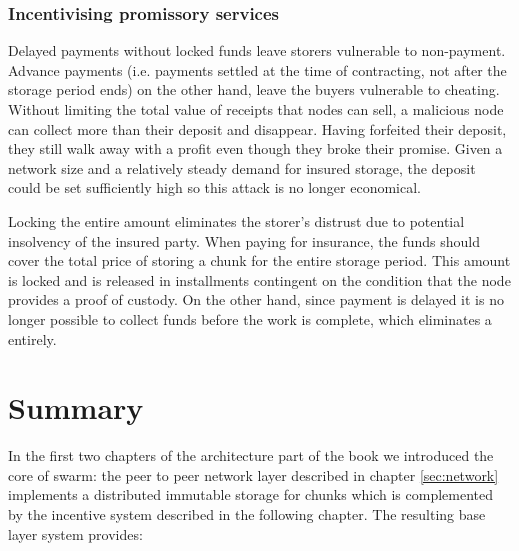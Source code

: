 \subsubsection{Incentivising promissory services}

Delayed payments without locked funds leave storers vulnerable to non-payment. Advance payments (i.e. payments settled at the time of contracting, not after the storage period ends) on the other hand, leave the buyers vulnerable to cheating. Without limiting the total value of receipts that nodes can sell, a malicious node can collect more than their deposit and disappear. Having forfeited their deposit, they still walk away with a profit even though they broke their promise. Given a network size and a relatively steady demand for insured storage, the deposit could be set sufficiently high so this attack is no longer economical.

Locking the entire amount eliminates the storer's distrust due to potential insolvency of the insured party. When paying for insurance, the funds should cover the total price of storing a chunk for the entire storage period. This amount is locked and is released in installments contingent on the condition that the node provides a proof of custody. On the other hand, since payment is delayed it is no longer possible to collect funds before the work is complete, which eliminates a  entirely.

\section{Summary}


In the first two chapters of the architecture part of the book we introduced the core of swarm: the peer to peer network layer described in chapter \ref{sec:network} implements a distributed immutable storage for chunks which is complemented by the incentive system described in the following chapter. The resulting base layer system provides:

